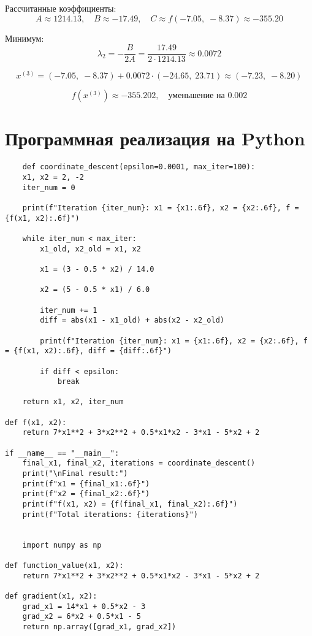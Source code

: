 \documentclass{article}
\begin{document}
Рассчитанные коэффициенты:
\[
A \approx 1214.13,\quad B \approx -17.49,\quad C \approx f(-7.05,\;-8.37) \approx -355.20
\]

Минимум:
\[
\lambda_2 = -\frac{B}{2A} = \frac{17.49}{2 \cdot 1214.13} \approx 0.0072
\]

\[
x^{(3)} = (-7.05,\;-8.37) + 0.0072 \cdot (-24.65,\; 23.71) \approx (-7.23,\; -8.20)
\]

\[
f(x^{(3)}) \approx -355.202,\quad \text{уменьшение на } 0.002
\]



\section{Программная реализация на Python}


\begin{lstlisting}
    def coordinate_descent(epsilon=0.0001, max_iter=100):
    x1, x2 = 2, -2
    iter_num = 0

    print(f"Iteration {iter_num}: x1 = {x1:.6f}, x2 = {x2:.6f}, f = {f(x1, x2):.6f}")

    while iter_num < max_iter:
        x1_old, x2_old = x1, x2

        x1 = (3 - 0.5 * x2) / 14.0

        x2 = (5 - 0.5 * x1) / 6.0

        iter_num += 1
        diff = abs(x1 - x1_old) + abs(x2 - x2_old)

        print(f"Iteration {iter_num}: x1 = {x1:.6f}, x2 = {x2:.6f}, f = {f(x1, x2):.6f}, diff = {diff:.6f}")

        if diff < epsilon:
            break

    return x1, x2, iter_num

def f(x1, x2):
    return 7*x1**2 + 3*x2**2 + 0.5*x1*x2 - 3*x1 - 5*x2 + 2

if __name__ == "__main__":
    final_x1, final_x2, iterations = coordinate_descent()
    print("\nFinal result:")
    print(f"x1 = {final_x1:.6f}")
    print(f"x2 = {final_x2:.6f}")
    print(f"f(x1, x2) = {f(final_x1, final_x2):.6f}")
    print(f"Total iterations: {iterations}")


    import numpy as np

def function_value(x1, x2):
    return 7*x1**2 + 3*x2**2 + 0.5*x1*x2 - 3*x1 - 5*x2 + 2

def gradient(x1, x2):
    grad_x1 = 14*x1 + 0.5*x2 - 3
    grad_x2 = 6*x2 + 0.5*x1 - 5
    return np.array([grad_x1, grad_x2])


\end{lstlisting}
\end{document}

